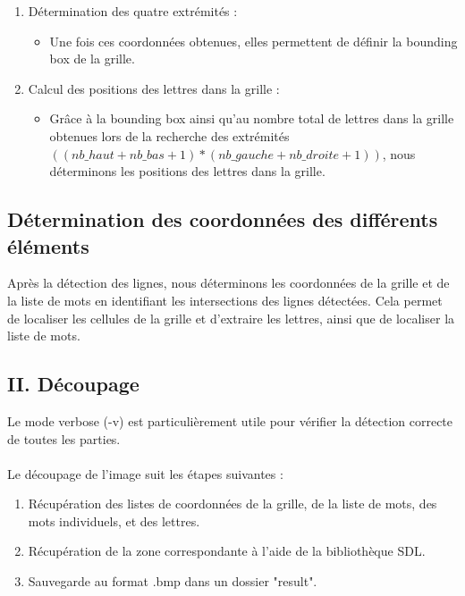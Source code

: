 \begin{enumerate}
    \item \noindent Détermination des quatre extrémités :
    \begin{itemize}
        \item \noindent Une fois ces coordonnées obtenues, elles permettent de définir la bounding box de la grille.
    \end{itemize}

    \item \noindent Calcul des positions des lettres dans la grille :
    \begin{itemize}
        \item \noindent Grâce à la bounding box ainsi qu'au nombre total de lettres dans la grille obtenues lors de la recherche des extrémités $((nb\_haut + nb\_bas + 1) * (nb\_gauche + nb\_droite + 1))$, nous déterminons les positions des lettres dans la grille.
    \end{itemize}
\end{enumerate}


\subsection{Détermination des coordonnées des différents éléments}

Après la détection des lignes, nous déterminons les coordonnées de la grille et de la liste de mots en identifiant les intersections des lignes détectées. Cela permet de localiser les cellules de la grille et d'extraire les lettres, ainsi que de localiser la liste de mots.

\subsection{II. Découpage}

Le mode verbose (-v) est particulièrement utile pour vérifier la détection correcte de toutes les parties.\\\\
Le découpage de l'image suit les étapes suivantes :

\begin{enumerate}
  \item{Récupération des listes de coordonnées de la grille, de la liste de mots, des mots individuels, et des lettres.}
  \item{Récupération de la zone correspondante à l'aide de la bibliothèque SDL.}
  \item{Sauvegarde au format .bmp dans un dossier "result".}
\end{enumerate}

